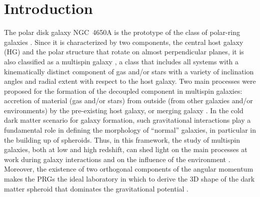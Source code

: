 \documentclass{aa}
\begin{document}


   \maketitle
%

\section{Introduction}\label{intro}
   
The polar disk galaxy NGC~4650A is  the prototype of the  
  class of polar-ring galaxies \citep[PRG, see][for a
  review]{Iod2014}. Since it is characterized by two components, the
  central host galaxy (HG) and the polar structure that rotate on
  almost perpendicular planes, it is also classified as a multispin
  galaxy \citep{Rubin1994},  a  class that includes all systems with a kinematically distinct
component of gas and/or stars with a variety of inclination angles
and radial extent with respect to the host galaxy.
Two main processes were proposed for the formation of the decoupled
component in multispin galaxies: accretion of material (gas and/or
stars) from outside (from other galaxies and/or environments) by the
pre-existing host galaxy, or merging galaxy  \citep[see][for
reviews]{Combes2014,Iod2014}.  In the cold dark matter scenario for
galaxy formation, such gravitational interactions play a fundamental
role in defining the morphology of ``normal'' galaxies, in particular in
the building up of spheroids. Thus, in this framework, the study of
multispin galaxies, both at low and high redshift, can shed light on
the main processes at work during galaxy interactions and on the
influence of the environment \citep[see][for a review]{Cons2014}.
Moreover, the existence of two orthogonal components of the angular
momentum makes the PRGs the ideal laboratory in which to derive the
3D shape of the dark matter spheroid that dominates the
gravitational potential \citep[see][for a review]{Arnaboldi2014}.
\end{document}
